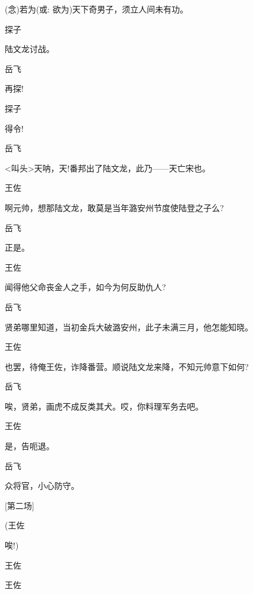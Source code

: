 {{{{({\akai 念})若为({\akai 或}: 欲为)天下奇男子，须立人间未有功。}

{探子\hspace{30pt}~

陆文龙讨战。}

{岳飞\hspace{30pt}~

再探!}

{探子\hspace{30pt}~

得令!}

{岳飞

\textless{}叫头\textgreater{}天呐，天!番邦出了陆文龙，此乃------天亡宋也。}

{王佐\hspace{30pt}~

啊元帅，想那陆文龙，敢莫是当年潞安州节度使陆登之子么?}

{岳飞\hspace{30pt}~

正是。}

{王佐\hspace{30pt}~

闻得他父命丧金人之手，如今为何反助仇人?}

{岳飞

贤弟哪里知道，当初金兵大破潞安州，此子未满三月，他怎能知晓。}

{王佐

也罢，待俺王佐，诈降番营。顺说陆文龙来降，不知元帅意下如何?}

岳飞\hspace{30pt}~

唉，贤弟，画虎不成反类其犬。哎，你料理军务去吧。

{王佐\hspace{30pt}~

是，告呃退。}

{岳飞\hspace{30pt}~

众将官，小心防守。}

{[}第二场{]}

{(王佐\hspace{30pt}~

唉!)}

{王佐\hspace{30pt}~

 }

{王佐\hspace{30pt}~

 }

}}}
